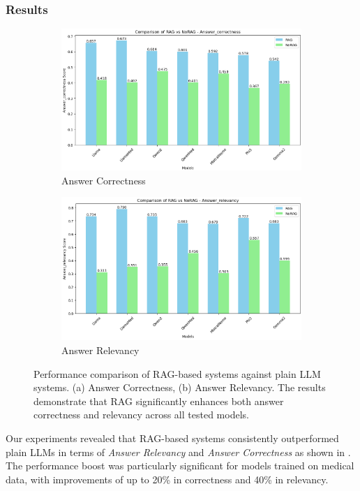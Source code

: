 \subsubsection{Results}
%
\begin{figure}[h]
    \centering
    \begin{subfigure}{0.9\textwidth}
        \includegraphics[width=\textwidth]{figures/RAGvsNoRAG_correctness}
        \caption{Answer Correctness}
        \label{fig:ragvsnorag_correctness}
    \end{subfigure}
        \begin{subfigure}{0.9\textwidth}
        \includegraphics[width=\textwidth]{figures/RAGvsNoRAG_relevancy}
        \caption{Answer Relevancy}
        \label{fig:ragvsnorag_relevancy}
    \end{subfigure}
    \caption{
      Performance comparison of \gls{RAG}-based systems against plain \gls{LLM} systems.
      (a) Answer Correctness, (b) Answer Relevancy.
      The results demonstrate that \gls{RAG} significantly enhances both answer correctness and relevancy across all tested models.
    }
    \label{fig:ragvsnorag}
\end{figure}
%
Our experiments revealed that \gls{RAG}-based systems consistently outperformed plain \glspl{LLM} in terms of \textit{Answer Relevancy} and \textit{Answer Correctness} as shown in .
%
The performance boost was particularly significant for models trained on medical data, with improvements of up to 20\% in correctness and 40\% in relevancy.

